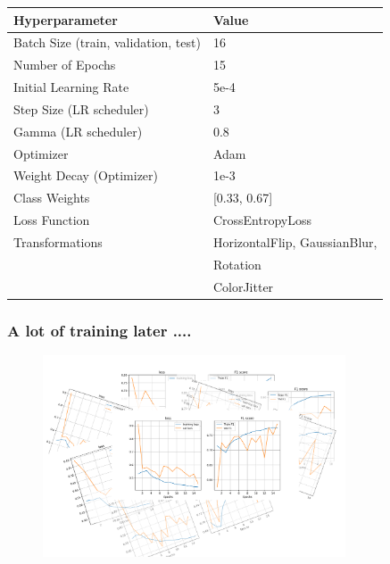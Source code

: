 \documentclass{beamer}
\begin{document}
\begin{frame}

\begin{table}[]
\begin{tabular}{ll}
\hline
\textbf{Hyperparameter} & \textbf{Value} \\ \hline
Batch Size (train, validation, test) & 16 \\
Number of Epochs & 15 \\
Initial Learning Rate & 5e-4 \\
Step Size (LR scheduler) & 3 \\
Gamma (LR scheduler) & 0.8 \\
Optimizer & Adam \\
Weight Decay (Optimizer) & 1e-3 \\
Class Weights & [0.33, 0.67] \\
Loss Function & CrossEntropyLoss \\
Transformations & HorizontalFlip, GaussianBlur, \\
& Rotation \\
& ColorJitter  \\ \hline
\end{tabular}
\end{table}

\end{frame}



\begin{frame}
\frametitle{A lot of training later ....}

    \begin{figure}
        \includegraphics[width=0.8\textwidth]{figures/lotoftraining.pdf}
    \caption{}
    \end{figure}

\end{frame}
\end{document}
